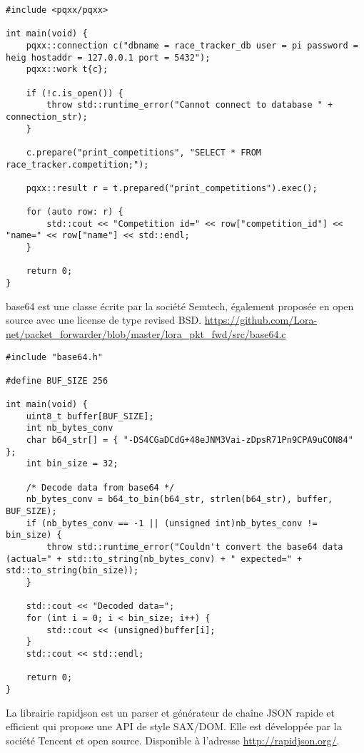 \begin{lstlisting}[style=CStyle]
#include <pqxx/pqxx>

int main(void) {
	pqxx::connection c("dbname = race_tracker_db user = pi password = heig hostaddr = 127.0.0.1 port = 5432");
	pqxx::work t{c};

	if (!c.is_open()) {
		throw std::runtime_error("Cannot connect to database " + connection_str);
	}

	c.prepare("print_competitions", "SELECT * FROM race_tracker.competition;");

	pqxx::result r = t.prepared("print_competitions").exec();
	
	for (auto row: r) {
		std::cout << "Competition id=" << row["competition_id"] << "name=" << row["name"] << std::endl;
	}

	return 0;
}
\end{lstlisting}

base64 est une classe écrite par la société Semtech, également proposée en open source avec une license de type revised BSD. \url{https://github.com/Lora-net/packet_forwarder/blob/master/lora_pkt_fwd/src/base64.c}

\begin{lstlisting}[style=CStyle]
#include "base64.h"

#define BUF_SIZE 256

int main(void) {
	uint8_t buffer[BUF_SIZE];
	int nb_bytes_conv
	char b64_str[] = { "-DS4CGaDCdG+48eJNM3Vai-zDpsR71Pn9CPA9uCON84" };
	int bin_size = 32;

	/* Decode data from base64 */
	nb_bytes_conv = b64_to_bin(b64_str, strlen(b64_str), buffer, BUF_SIZE);
	if (nb_bytes_conv == -1 || (unsigned int)nb_bytes_conv != bin_size) {
		throw std::runtime_error("Couldn't convert the base64 data (actual=" + std::to_string(nb_bytes_conv) + " expected=" + std::to_string(bin_size));
	}

	std::cout << "Decoded data=";
	for (int i = 0; i < bin_size; i++) {
		std::cout << (unsigned)buffer[i];
	}
	std::cout << std::endl;

	return 0;
}
\end{lstlisting}

La librairie rapidjson est un parser et générateur de chaîne JSON rapide et efficient qui propose une API de style SAX/DOM. Elle est développée par la société Tencent et open source. Disponible à l'adresse \url{http://rapidjson.org/}.

